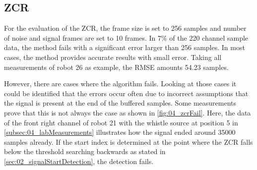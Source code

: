 
\subsection{ZCR}
\label{subsec:04_zcr}

For the evaluation of the \ac{ZCR},
the frame size is set to 256 samples and number of noise and signal frames
are set to 10 frames.
In 7\si{\percent} of the 220 channel sample data, the method fails with a significant
error larger than 256 samples. In most cases, the method provides accurate results with
small error. Taking all measurements of robot 26 as example, the \ac{RMSE}
amounts 54.23 samples.

However, there are cases where the algorithm fails. Looking at those cases it
could be identified that the errors occur often due to incorrect assumptions
that the signal is present at the end of the buffered samples.
Some measurements prove that this is not always the case as shown in
\cref{fig:04_zcrFail}.
Here, the data of the front right channel of robot 21 with the whistle source
at position 5 in \cref{subsec:04_labMeasurements}
illustrates how the signal ended around 35000 samples already. 
If the start index is determined at the point where the \ac{ZCR}
falls below the threshold searching backwards as stated in \cref{sec:02_signalStartDetection},
the detection fails.

